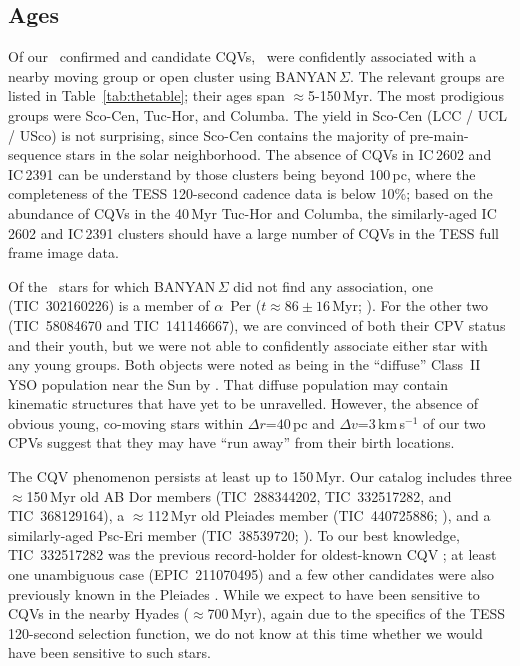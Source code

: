 \documentclass[11pt,twocolumn,tighten]{aastex63}
\begin{document}
\subsection{Ages}

Of our \ncpvsfound\ confirmed and candidate CQVs, \nnotfieldbanyan\
were confidently associated with a nearby moving group or open cluster
using BANYAN\,$\Sigma$.  The relevant groups are listed in
Table~\ref{tab:thetable}; their ages span $\approx$5-150\,Myr.  The
most prodigious groups were Sco-Cen, Tuc-Hor, and Columba.  The yield
in Sco-Cen (LCC / UCL / USco) is not surprising, since Sco-Cen
contains the majority of pre-main-sequence stars in the solar
neighborhood.  The absence of CQVs in IC\,2602 and IC\,2391 can be
understand by those clusters being beyond 100\,pc, where the
completeness of the TESS 120-second cadence data is below 10\%; based
on the abundance of CQVs in the 40\,Myr Tuc-Hor and Columba, the
similarly-aged IC\,2602 and IC\,2391 clusters should have a large
number of CQVs in the TESS full frame image data.

Of the \ngoodsfieldbanyan\ stars for which BANYAN\,$\Sigma$ did not
find any association, one (TIC~302160226) is a member of $\alpha$~Per
($t\approx 86\pm16$\,Myr;
\citealt{2021A&A...645A..84M,2022arXiv221109822B}).  For the other two
(TIC~58084670 and TIC~141146667), we are convinced of both their CPV
status and their youth, but we were not able to confidently associate
either star with any young groups.  Both objects were noted as being in the
``diffuse'' Class~II YSO population near the Sun by \citet{2021ApJ...917...23K}.
That diffuse population may contain kinematic structures that have yet
to be unravelled.  However, the absence of obvious young, co-moving
stars within $\Delta r$=$40$\,pc and $\Delta v$=$3$\,km\,s$^{-1}$ of
our two CPVs suggest that they may have ``run away'' from their birth
locations.

The CQV phenomenon persists at least up to 150\,Myr.  Our catalog
includes three $\approx$150\,Myr old AB Dor members (TIC~288344202,
TIC~332517282, and TIC~368129164), a $\approx$112\,Myr old Pleiades
member (TIC~440725886; \citealt{CantatGaudin_2020}), and a
similarly-aged Psc-Eri member (TIC~38539720;
\citealt{2020A&A...639A..64R}).  To our best knowledge, TIC~332517282
was the previous record-holder for oldest-known CQV
\citep{2019ApJ...876..127Z,2022AJ....163..144G}; at least one
unambiguous case (EPIC~211070495) and a few other candidates were also
previously known in the Pleiades \citep{2016AJ....152..114R}.  While
we expect to have been sensitive to CQVs in the nearby Hyades
($\approx$700\,Myr), again due to the specifics of the TESS 120-second
selection function, we do not know at this time whether we would have
been sensitive to such stars.
\end{document}
